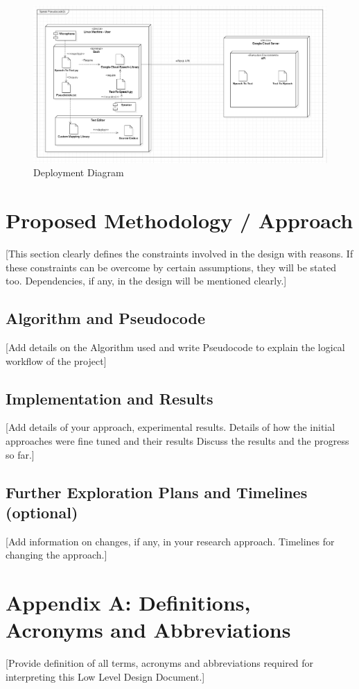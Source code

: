 \documentclass[12pt]{article}
\begin{document}
\begin{figure}[H]
{\centering
\centerline{
    \includegraphics[width=\textwidth]{Deployment_diag.png}
}
\caption{Deployment Diagram}
}
\end{figure}

\section{Proposed Methodology / Approach}
[This section clearly defines the constraints involved in the design with reasons. If these constraints can be overcome by certain assumptions, they will be stated too. Dependencies, if any, in the design will be mentioned clearly.] 

\subsection{Algorithm and Pseudocode}
[Add details on the Algorithm used and write Pseudocode to explain the logical workflow of the project]

\subsection{Implementation and Results}
[Add details of your approach, experimental results. 
Details of how the initial approaches were fine tuned and their results
Discuss the results and the progress so far.]

\subsection{Further Exploration Plans and Timelines (optional)}
[Add information on changes, if any, in your research approach.
Timelines for changing the approach.]


\section*{Appendix A:  Definitions, Acronyms and Abbreviations}
[Provide definition of all terms, acronyms and abbreviations required for interpreting this Low Level Design Document.]
\end{document}
